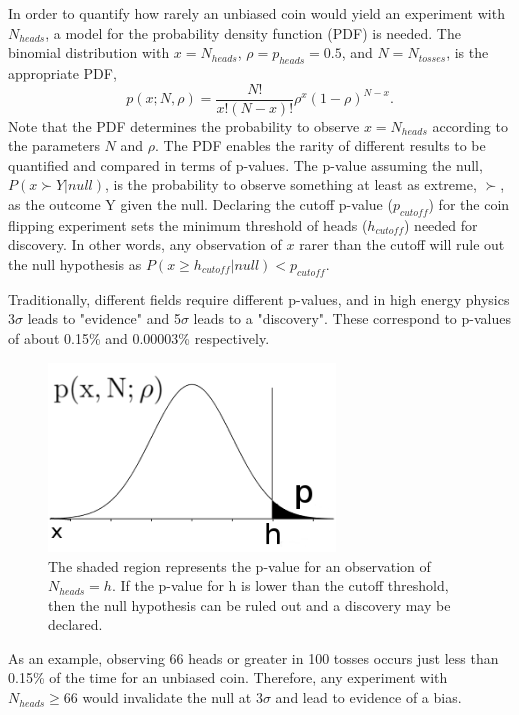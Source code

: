 \documentclass[12pt]{article}
\begin{document}
In order to quantify how rarely an unbiased coin would yield an experiment with $N_{heads}$, a model for the probability density function (PDF) is needed. The binomial distribution with $x = N_{heads}$, $\rho = p_{heads} = 0.5$, and $N = N_{tosses}$, is the appropriate PDF,
\begin{equation}
p(x;N,\rho) = \frac{N!}{x! (N - x)!}\rho^{x}(1-\rho)^{N-x}.
\end{equation}
Note that the PDF determines the probability to observe $x = N_{heads}$ according to the parameters $N$ and $\rho$. The PDF enables the rarity of different results to be quantified and compared in terms of p-values. The p-value assuming the null, $P(x \succ Y|null)$, is the probability to observe something at least as extreme, $\succ$, as the outcome Y given the null. Declaring the cutoff p-value ($p_{cutoff}$) for the coin flipping experiment sets the minimum threshold of heads ($h_{cutoff}$) needed for discovery. In other words, any observation of $x$ rarer than the cutoff will rule out the null hypothesis as $P(x \geq h_{cutoff}|null) < p_{cutoff}$. 

Traditionally, different fields require different p-values, and in high energy physics 3$\sigma$ leads to "evidence" and 5$\sigma$ leads to a "discovery". These correspond to p-values of about 0.15\% and 0.00003\% respectively.
\begin{figure}[h!]
  \centering
  \includegraphics[width=3in]{images/p-value.png}
  \caption[An illustrated example of a p-value.]
   {The shaded region represents the p-value for an observation of $N_{heads}=h$. If the p-value for h is lower than the cutoff threshold, then the null hypothesis can be ruled out and a discovery may be declared.}
\label{fig:pvalue_ex}
\end{figure}
As an example, observing 66 heads or greater in 100 tosses occurs just less than 0.15\% of the time for an unbiased coin. Therefore, any experiment with $N_{heads} \geq 66$ would invalidate the null at $3\sigma$ and lead to evidence of a bias.
\end{document}
